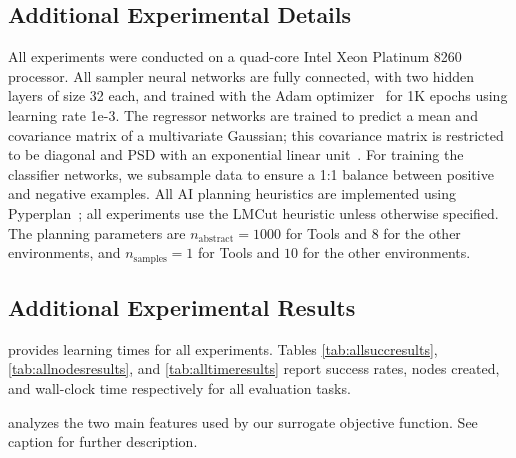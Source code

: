 \subsection{Additional Experimental Details}
\label{app:additional-experimental-details}
All experiments were conducted on a quad-core Intel Xeon Platinum 8260 processor.
All sampler neural networks are fully connected, with two hidden layers of size 32 each, and trained with the Adam optimizer~\cite{kingma2014adam} for 1K epochs using learning rate 1e-3. The regressor networks are trained to predict a mean and covariance matrix of a multivariate Gaussian; this covariance matrix is restricted to be diagonal and PSD with an exponential linear unit~\cite{clevert2015fast}.
For training the classifier networks, we subsample data to ensure a 1:1 balance between positive and negative examples.
All AI planning heuristics are implemented using Pyperplan~\cite{pyperplan}; all experiments use the LMCut heuristic unless otherwise specified.
The planning parameters are $n_{\text{abstract}} = 1000$ for Tools and $8$ for the other environments, and $n_{\text{samples}} = 1$ for Tools and $10$ for the other environments.


\subsection{Additional Experimental Results}
\label{app:results}

 provides learning times for all experiments.
Tables \ref{tab:allsuccresults}, \ref{tab:allnodesresults}, and \ref{tab:alltimeresults} report success rates, nodes created, and wall-clock time respectively for all evaluation tasks.

 analyzes the two main features used by our surrogate objective function. See caption for further description.


